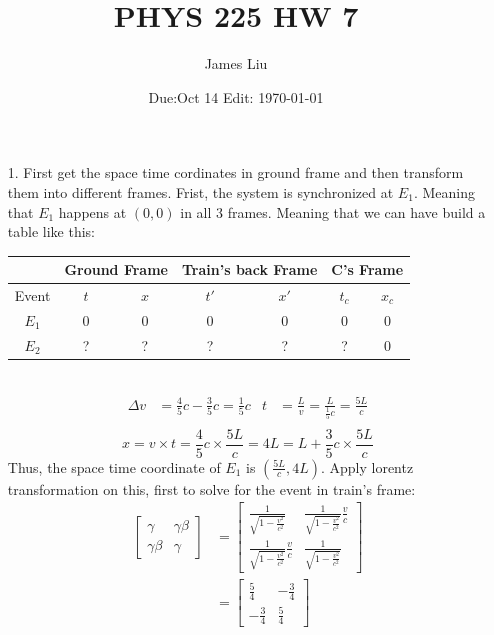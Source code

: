 \documentclass{article}
\date{Due:Oct 14 Edit: \today}
\title{PHYS 225 HW 7}
\author{James Liu}
\begin{document}
\maketitle
\begin{itemize}
    \item [1.] First get the space time cordinates in ground frame and then transform them into different frames. Frist, the system is synchronized at \(E_1\). Meaning that \(E_1\) happens at \((0,0)\) in all 3 frames. Meaning that we can have build a table like this: 
    \\
    \begin{tabular}{c | c c | c c | c c|}
        &\multicolumn{2}{c|}{Ground Frame}&\multicolumn{2}{c|}{Train's back Frame}&\multicolumn{2}{c|}{C's Frame}\\
        \hline Event& $t$&$x$&$t'$&$x'$&$t_c$&$x_c$\\
        $E_1$& 0&0&0&0&0&0\\ 
        $E_2$& ?&?&?&?&?&0
    \end{tabular}\\
    \begin{align*}
        \Delta v &= \frac{4}{5}c-\frac{3}{5}c=\frac{1}{5}c&
        t &= \frac{L}{v} = \frac{L}{\frac{1}{5}c} = \frac{5L}{c}\\
    \end{align*}
    \[x = v\times t  = \frac{4}{5}c\times \frac{5L}{c} = 4L = L+\frac{3}{5}c\times\frac{5L}{c}\]
    Thus, the space time coordinate of \(E_1\) is \( \left(\frac{5L}{c},4L\right)\). Apply lorentz transformation on this, first to solve for the event in train's frame:
    \begin{align*}
        \begin{bmatrix}
            \gamma&\gamma\beta\\
            \gamma\beta&\gamma
        \end{bmatrix}&=
        \begin{bmatrix}
            \frac{1}{\sqrt{1-\frac{v^2}{c^2}}}&\frac{1}{\sqrt{1-\frac{v^2}{c^2}}}\frac{v}{c}\\
            \frac{1}{\sqrt{1-\frac{v^2}{c^2}}}\frac{v}{c}&\frac{1}{\sqrt{1-\frac{v^2}{c^2}}}
        \end{bmatrix}\\
        &=\begin{bmatrix}
            \frac{5}{4}&-\frac{3}{4}\\
            -\frac{3}{4}&\frac{5}{4}
        \end{bmatrix}\\

\end{align*}
\end{itemize}
\end{document}
